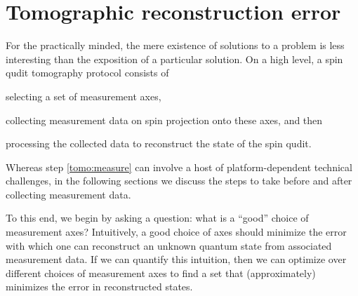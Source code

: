 \documentclass[a4paper,twocolumn,unpublished]{quantumarticle}
\begin{document}
\section{Tomographic reconstruction error}
\label{sec:error}

For the practically minded, the mere existence of solutions to a problem is less interesting than the exposition of a particular solution.
On a high level, a spin qudit tomography protocol consists of
\begin{enumerate*}
\item selecting a set of measurement axes,
\item collecting measurement data on spin projection onto these axes, and then
  \label{tomo:measure}
\item processing the collected data to reconstruct the state of the spin qudit.
\end{enumerate*}
Whereas step \ref{tomo:measure} can involve a host of platform-dependent technical challenges, in the following sections we discuss the steps to take before and after collecting measurement data.

To this end, we begin by asking a question: what is a ``good'' choice of measurement axes?
Intuitively, a good choice of axes should minimize the error with which one can reconstruct an unknown quantum state from associated measurement data.
If we can quantify this intuition, then we can optimize over different choices of measurement axes to find a set that (approximately) minimizes the error in reconstructed states.
\end{document}

